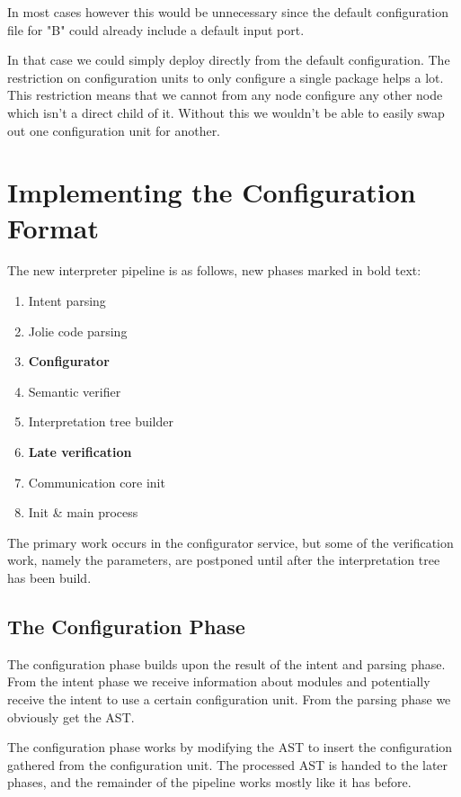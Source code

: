 In most cases however this would be unnecessary since the default
configuration file for "B" could already include a default input port.

In that case we could simply deploy directly from the default configuration.
The restriction on configuration units to only configure a single package helps
a lot. This restriction means that we cannot from any node configure any other
node which isn't a direct child of it. Without this we wouldn't be able to
easily swap out one configuration unit for another.

\section{Implementing the Configuration Format}
\label{sec:col_impl}

The new interpreter pipeline is as follows, new phases marked in bold text:

\begin{enumerate}
\item Intent parsing
\item Jolie code parsing
\item \textbf{Configurator}
\item Semantic verifier
\item Interpretation tree builder
\item \textbf{Late verification}
\item Communication core init
\item Init \& main process
\end{enumerate}

The primary work occurs in the configurator service, but some of the
verification work, namely the parameters, are postponed until after the
interpretation tree has been build.

\subsection{The Configuration Phase}

The configuration phase builds upon the result of the intent and parsing phase.
From the intent phase we receive information about modules and potentially
receive the intent to use a certain configuration unit. From the parsing phase
we obviously get the AST.

The configuration phase works by modifying the AST to insert the configuration
gathered from the configuration unit. The processed AST is handed to the later
phases, and the remainder of the pipeline works mostly like it has before.

